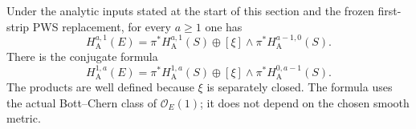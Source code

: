 \begin{theorem}
\label{r15s:first-strip}
Under the analytic inputs stated at the start of this section
and the frozen first-strip PWS replacement, for every
$a\geq1$ one has
\[
 H_{\mathrm A}^{a,1}(E)
  =\pi^*H_{\mathrm A}^{a,1}(S)
      \oplus [\xi]\wedge\pi^*H_{\mathrm A}^{a-1,0}(S).
\tag{FS15.8}\label{r15s:first-strip-formula}
\]
There is the conjugate formula
\[
 H_{\mathrm A}^{1,a}(E)
  =\pi^*H_{\mathrm A}^{1,a}(S)
      \oplus [\xi]\wedge\pi^*H_{\mathrm A}^{0,a-1}(S).
\tag{FS15.9}\label{r15s:conjugate-strip}
\]
The products are well defined because $\xi$ is separately
closed.  The formula uses the actual Bott--Chern class of
$\mathcal O_E(1)$; it does not depend on the chosen smooth
metric.
\end{theorem}


